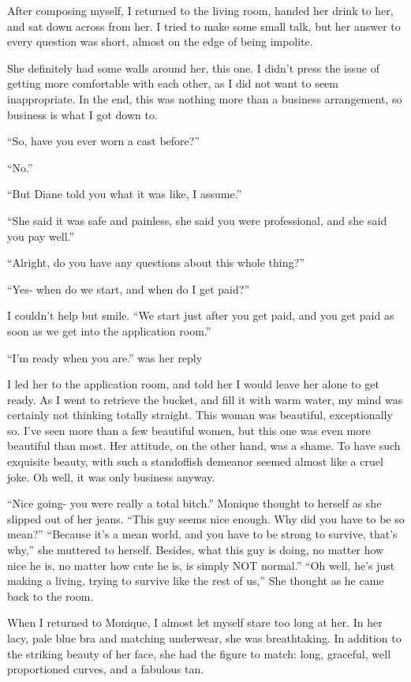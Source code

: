 After composing myself, I returned to the living room, handed her drink to her, and sat down
across from her. I tried to make some small talk, but her answer to every question was short,
almost on the edge of being impolite.

She definitely had some walls around her, this one. I didn't press the issue of getting more
comfortable with each other, as I did not want to seem inappropriate. In the end, this was
nothing more than a business arrangement, so business is what I got down to.

``So, have you ever worn a cast before?''

``No.''

``But Diane told you what it was like, I assume.''

``She said it was safe and painless, she said you were professional, and she said you pay
well.''

``Alright, do you have any questions about this whole thing?''

``Yes- when do we start, and when do I get paid?''

I couldn't help but smile. ``We start just after you get paid, and you get paid as soon as
we get into the application room.''

``I'm ready when you are.'' was her reply

I led her to the application room, and told her I would leave her alone to get ready. As I
went to retrieve the bucket, and fill it with warm water, my mind was certainly not thinking
totally straight. This woman was beautiful, exceptionally so. I've seen more than a few
beautiful women, but this one was even more beautiful than most. Her attitude, on the other
hand, was a shame. To have such exquisite beauty, with such a standoffish demeanor seemed almost
like a cruel joke. Oh well, it was only business anyway.

\begin{thought}
``Nice going- you were really a total bitch.'' Monique thought to herself as she slipped out
of her jeans. ``This guy seems nice enough. Why did you have to be so mean?'' ``Because it's a
mean world, and you have to be strong to survive, that's why,'' she muttered to herself.
Besides, what this guy is doing, no matter how nice he is, no matter how cute he is, is simply
NOT normal.'' ``Oh well, he's just making a living, trying to survive like the rest of us,'' She
thought as he came back to the room.
\end{thought}

When I returned to Monique, I almost let myself stare too long at her. In her lacy, pale
blue bra and matching underwear, she was breathtaking. In addition to the striking beauty of her
face, she had the figure to match: long, graceful, well proportioned curves, and a fabulous tan.

